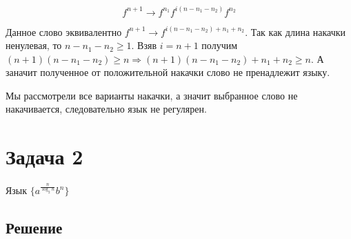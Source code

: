 \documentclass[a4paper, 14pt]{extarticle}
\begin{document}
\[ f^{n + 1} \to f^{n_1}f^{i (n - n_1 - n_2)}f^{n_2} \tag{2} \]

Данное слово эквивалентно $f^{n + 1} \to f^{i (n - n_1 - n_2) + n_1 + n_2}$. Так как
длина накачки ненулевая, то $n - n_1 - n_2 \ge 1$. Взяв $i = n + 1$ получим
$(n + 1) (n - n_1 - n_2) \ge n \Rightarrow (n + 1) (n - n_1 - n_2) + n_1 + n_2 \ge n$.
А заначит полученное от положительной накачки слово не пренадлежит языку.

Мы рассмотрели все варианты накачки, а значит выбранное слово не накачивается, следовательно
язык не регулярен.

\newpage
\section{Задача 2}

Язык $\{a^\frac{n}{\log_{2} n}b^n\}$

\subsection{Решение}

\begin{comment}
Заметим что при достаточно больших $x$ значение выражения $\frac{x}{\log_2x}$ возрастает,
это означает, что при достаточно больших значениях выражения $\frac{x}{\log_2x}$ корень
этого выражения единственен. Теперь для некоторого $n$ возьмем $n_0$ такое, что $n_0 > n$
и слово $a^\frac{n_0}{\log_2n_0}b^{n_0}$ пренадлежит языку. Такое $n_0$ всегда существует,
так как $n_0 = 2^{2^p}, p \in \mathbb{N}$ порождает слово из языка и может быть сколь угодно
большим. Теперь попробуем выбрать накачку, очевидно что она состоит либо только из $a$, либо
только из $b$, если же она состоит из обоих символов, то положительная накачка выводит слово
из языка, так как появляется множество чередований $a$ и $b$, хотя должно быть ровно одно. 
Также заметим что по количеству символов $a$ мы можем однозначно определить количество символов
$b$ из-за однозначности корня выражения описанного ранее. Обратное также, очевидно, верно.
Значит достаточно большая положительная накачка выводит слово из языка, так как нарушается
соотношение количества символов. Так как накачка выводит слово из языка, то язык не регулярен.
\end{comment}
\end{document}
